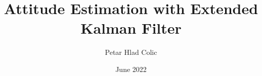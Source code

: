 \documentclass[envcountsect]{beamer}
\title{Attitude Estimation with Extended Kalman Filter}
\author{Petar Hlad Colic}
\institute{CSAS \\ ETSETB - UPC}
\date{June 2022}
\begin{document}
    \frame{\titlepage}
    
    \frame{\tableofcontents}
    
    
    
    
    
    
    
    
    
    
\end{document}

